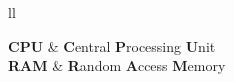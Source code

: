 \begin{abbreviations}{ll} %

\textbf{CPU} & \textbf{C}entral \textbf{P}rocessing \textbf{U}nit\\
\textbf{RAM} & \textbf{R}andom \textbf{A}ccess \textbf{M}emory\\


\end{abbreviations}